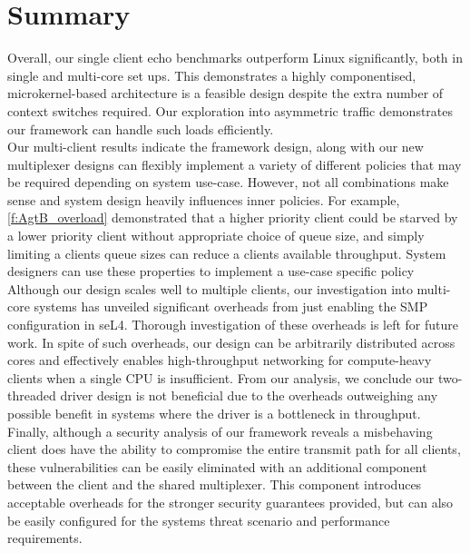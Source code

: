 \section{Summary}

Overall, our single client echo benchmarks outperform Linux significantly, both in single and multi-core set ups.
This demonstrates a highly componentised, microkernel-based architecture is a feasible design despite the extra number
of context switches required. Our exploration into asymmetric traffic demonstrates our framework 
can handle such loads efficiently.\\
Our multi-client results indicate the framework design, along with our new multiplexer 
designs can flexibly implement a variety of different policies that may be required depending on system use-case.
However, not all combinations make sense and system design heavily influences inner policies. 
For example, \autoref{f:AgtB_overload} demonstrated
that a higher priority client could be starved by a lower priority client without appropriate choice
of queue size, and simply limiting a clients queue sizes can reduce a clients available throughput. System designers
can use these properties to implement a use-case specific policy \\

Although our design scales well to multiple clients, our investigation into multi-core systems has 
unveiled significant overheads from just enabling the SMP configuration in seL4.
Thorough investigation of these overheads is left for future work. In spite of such overheads, our design can
be arbitrarily distributed across cores and effectively enables high-throughput networking for compute-heavy clients when a 
single CPU is insufficient. From our analysis, we conclude our two-threaded driver design is not beneficial
due to the overheads outweighing any possible benefit in systems where the driver is a bottleneck in throughput.\\

Finally, although a security analysis of our framework reveals a misbehaving client does have the ability to compromise
the entire transmit path for all clients, these vulnerabilities can be easily eliminated with an additional component between 
the client and the shared multiplexer. This component introduces acceptable overheads for the stronger security
guarantees provided, but can also be easily configured for the systems threat scenario and performance requirements. 
